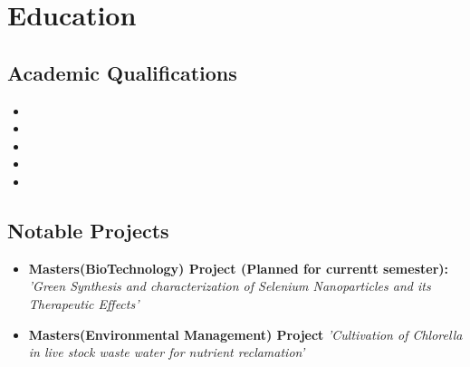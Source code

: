 \documentclass[11pt,a4paper,sans]{moderncv}
\begin{document}
\section{Education}

\vspace{5pt}

\subsection{Academic Qualifications}

\vspace{5pt}

\begin{itemize}

\item{}

\item{}

\item{}  %

\item{}
\item{}
\end{itemize}

\vspace{2pt}

\subsection{Notable Projects}

\vspace{5pt}

\begin{itemize}

\item{\textbf{Masters(BioTechnology) Project (Planned for currentt semester):} \textit{'Green Synthesis and characterization of Selenium Nanoparticles and its Therapeutic Effects'}

\vspace{3pt}

\small{}}

\vspace{3pt}

\item{\textbf{Masters(Environmental Management) Project} \textit{'Cultivation of Chlorella in live stock waste water for nutrient reclamation'}

\vspace{3pt}

\small{}}




\end{itemize}
\end{document}
